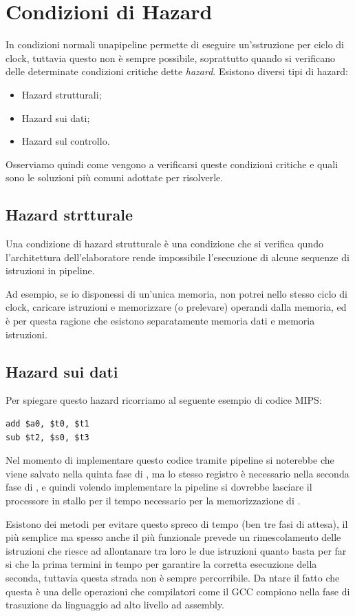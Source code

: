 \documentclass[class=book, crop=false, oneside]{standalone}
\begin{document}
\section{Condizioni di Hazard}
In condizioni normali unapipeline permette di eseguire un'sstruzione per ciclo di clock, tuttavia questo non è sempre possibile, soprattutto quando si verificano delle determinate condizioni critiche dette \emph{hazard}.
Esistono diversi tipi di hazard:
\begin{itemize}
	\item Hazard strutturali;
	\item Hazard sui dati;
	\item Hazard sul controllo.
\end{itemize}
Osserviamo quindi come vengono a verificarsi queste condizioni critiche e quali sono le soluzioni più comuni adottate per risolverle.

\subsection{Hazard strtturale}
Una condizione di hazard strutturale è una condizione che si verifica qundo l'architettura dell’elaboratore rende impossibile l’esecuzione di alcune sequenze di istruzioni in pipeline.

Ad esempio, se io disponessi di un’unica memoria, non potrei nello stesso ciclo di clock, caricare istruzioni e memorizzare (o prelevare) operandi dalla memoria, ed è per questa ragione che esistono separatamente memoria dati e memoria istruzioni.

\subsection{Hazard sui dati}
Per spiegare questo hazard ricorriamo al seguente esempio di codice MIPS:
\begin{verbatim}
add $a0, $t0, $t1
sub $t2, $s0, $t3
\end{verbatim}
Nel momento di implementare questo codice tramite pipeline si noterebbe che  viene salvato nella quinta fase di , ma lo stesso registro è necessario nella seconda fase di , e quindi volendo implementare la pipeline si dovrebbe lasciare il processore in stallo per il tempo necessario per la memorizzazione di .

Esistono dei metodi per evitare questo spreco di tempo (ben tre fasi di attesa), il più semplice ma spesso anche il più funzionale prevede un rimescolamento delle istruzioni che riesce ad allontanare tra loro le due istruzioni quanto basta per far si che la prima termini in tempo per garantire la corretta esecuzione della seconda, tuttavia questa strada non è sempre percorribile.
Da ntare il fatto che questa è una delle operazioni che compilatori come il GCC compiono nella fase di trasuzione da linguaggio ad alto livello ad assembly.
\end{document}
